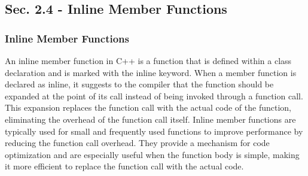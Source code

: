 \subsection*{Sec. 2.4 - Inline Member Functions}
\subsubsection*{Inline Member Functions}

An inline member function in C++ is a function that is defined within a class declaration and is marked with the inline keyword. When a member function is declared as inline, it suggests to the compiler that 
the function should be expanded at the point of its call instead of being invoked through a function call. This expansion replaces the function call with the actual code of the function, eliminating the overhead 
of the function call itself. Inline member functions are typically used for small and frequently used functions to improve performance by reducing the function call overhead. They provide a mechanism for code 
optimization and are especially useful when the function body is simple, making it more efficient to replace the function call with the actual code. \\

